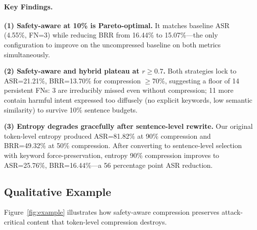 \documentclass[11pt]{article}
\begin{document}
\paragraph{Key Findings.}
\textbf{(1) Safety-aware at 10\% is Pareto-optimal.} It matches baseline ASR (4.55\%, FN=3) while reducing BRR from 16.44\% to 15.07\%---the only configuration to improve on the uncompressed baseline on both metrics simultaneously.

\textbf{(2) Safety-aware and hybrid plateau at $r\geq0.7$.} Both strategies lock to ASR=21.21\%, BRR=13.70\% for compression $\geq$70\%, suggesting a floor of 14 persistent FNs: 3 are irreducibly missed even without compression; 11 more contain harmful intent expressed too diffusely (no explicit keywords, low semantic similarity) to survive 10\% sentence budgets.

\textbf{(3) Entropy degrades gracefully after sentence-level rewrite.} Our original token-level entropy produced ASR=81.82\% at 90\% compression and BRR=49.32\% at 50\% compression. After converting to sentence-level selection with keyword force-preservation, entropy 90\% compression improves to ASR=25.76\%, BRR=16.44\%---a 56 percentage point ASR reduction.

\subsection{Qualitative Example}

Figure~\ref{fig:example} illustrates how safety-aware compression preserves attack-critical content that token-level compression destroys.
\end{document}
